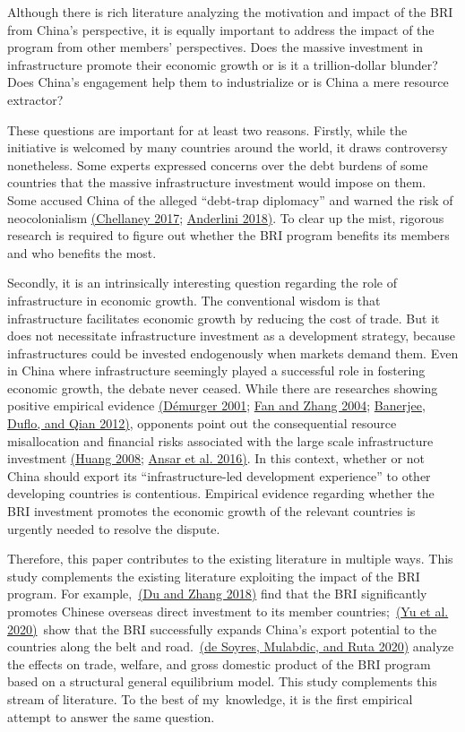 \documentclass[10pt,a4paper]{article}
\begin{document}
Although there is rich literature analyzing the motivation and impact of
the BRI from China's perspective, it is equally important to address the
impact of the program from other members' perspectives. Does the massive
investment in infrastructure promote their economic growth or is it a
trillion-dollar blunder? Does China's engagement help them to
industrialize or is China a mere resource extractor?~

These questions are important for at least two reasons. Firstly, while
the initiative is welcomed by many countries around the world, it draws
controversy nonetheless. Some experts expressed concerns over the debt
burdens of some countries that the massive infrastructure investment
would impose on them. Some accused China of the alleged ``debt-trap
diplomacy'' and warned the risk of neocolonialism \hyperref[csl:9]{(Chellaney 2017}; \hyperref[csl:10]{Anderlini 2018)}. To
clear up the mist, rigorous research is required to figure out whether
the BRI program benefits its members and who benefits the most.~

Secondly, it is an intrinsically interesting question regarding the role
of infrastructure in economic growth. The conventional wisdom is that
infrastructure facilitates economic growth by reducing the cost of
trade. But it does not necessitate infrastructure investment as a
development strategy, because infrastructures could be invested
endogenously when markets demand them. Even in China where
infrastructure seemingly played a successful role in fostering economic
growth, the debate never ceased. While there are researches showing
positive empirical evidence \hyperref[csl:11]{(D{\'{e}}murger 2001}; \hyperref[csl:12]{Fan and Zhang 2004}; \hyperref[csl:13]{Banerjee, Duflo, and Qian 2012)}, opponents point out the
consequential resource misallocation and financial risks associated with
the large scale infrastructure investment \hyperref[csl:14]{(Huang 2008}; \hyperref[csl:15]{Ansar et al. 2016)}. In this
context, whether or not China should export its ``infrastructure-led
development experience'' to other developing countries is contentious.
Empirical evidence regarding whether the BRI investment promotes the
economic growth of the relevant countries is urgently needed to resolve
the dispute.~

Therefore, this paper contributes to the existing literature in multiple
ways. This study complements the existing literature exploiting the
impact of the BRI program. For example,~\hyperref[csl:8]{(Du and Zhang 2018)} find that
the BRI significantly promotes Chinese overseas direct investment to its
member countries;~\hyperref[csl:16]{(Yu et al. 2020)}~show that the BRI successfully
expands China's export potential to the countries along the belt and
road.~\hyperref[csl:17]{(de Soyres, Mulabdic, and Ruta 2020)} analyze the effects on trade, welfare, and
gross domestic product of the BRI program based on a structural general
equilibrium model. This study complements this stream of literature. To
the best of my~knowledge, it is the first empirical attempt to answer
the same question.~
\end{document}
